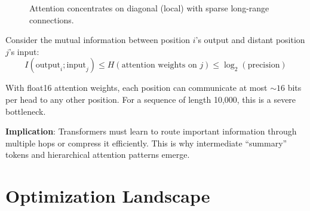 \begin{figure}[h]
\centering
\caption{Attention concentrates on diagonal (local) with sparse long-range connections.}
\end{figure}

\begin{remark}
    Consider the mutual information between position $i$'s output and distant position $j$'s input:
    \[
        I(\text{output}_i; \text{input}_j) \leq H(\text{attention weights on } j) \leq \log_2(\text{precision})
    \]

    With float16 attention weights, each position can communicate at most $\sim 16$ bits per head to any other position. For a sequence of length 10,000, this is a severe bottleneck.

    \textbf{Implication}: Transformers must learn to route important information through multiple hops or compress it efficiently. This is why intermediate ``summary'' tokens and hierarchical attention patterns emerge.
\end{remark}

\section{Optimization Landscape}

